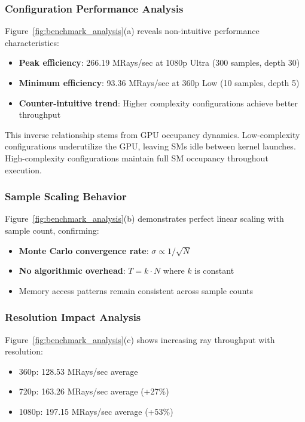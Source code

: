 \documentclass[conference]{IEEEtran}
\begin{document}
\subsubsection{Configuration Performance Analysis}
Figure~\ref{fig:benchmark_analysis}(a) reveals non-intuitive performance characteristics:
\begin{itemize}
    \item \textbf{Peak efficiency}: 266.19 MRays/sec at 1080p Ultra (300 samples, depth 30)
    \item \textbf{Minimum efficiency}: 93.36 MRays/sec at 360p Low (10 samples, depth 5)
    \item \textbf{Counter-intuitive trend}: Higher complexity configurations achieve better throughput
\end{itemize}

This inverse relationship stems from GPU occupancy dynamics. Low-complexity configurations underutilize the GPU, leaving SMs idle between kernel launches. High-complexity configurations maintain full SM occupancy throughout execution.

\subsubsection{Sample Scaling Behavior}
Figure~\ref{fig:benchmark_analysis}(b) demonstrates perfect linear scaling with sample count, confirming:
\begin{itemize}
    \item \textbf{Monte Carlo convergence rate}: $\sigma \propto 1/\sqrt{N}$
    \item \textbf{No algorithmic overhead}: $T = k \cdot N$ where $k$ is constant
    \item Memory access patterns remain consistent across sample counts
\end{itemize}

\subsubsection{Resolution Impact Analysis}
Figure~\ref{fig:benchmark_analysis}(c) shows increasing ray throughput with resolution:
\begin{itemize}
    \item 360p: 128.53 MRays/sec average
    \item 720p: 163.26 MRays/sec average (+27\%)
    \item 1080p: 197.15 MRays/sec average (+53\%)
\end{itemize}
\end{document}
